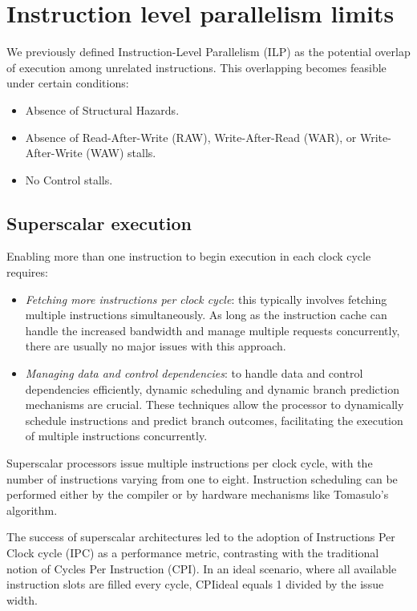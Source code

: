 \section{Instruction level parallelism limits}

We previously defined Instruction-Level Parallelism (ILP) as the potential overlap of execution among unrelated instructions. 
This overlapping becomes feasible under certain conditions:
\begin{itemize}
    \item Absence of Structural Hazards.
    \item Absence of Read-After-Write (RAW), Write-After-Read (WAR), or Write-After-Write (WAW) stalls.
    \item No Control stalls.
\end{itemize}

\subsection{Superscalar execution}
Enabling more than one instruction to begin execution in each clock cycle requires:
\begin{itemize}
    \item \textit{Fetching more instructions per clock cycle}: this typically involves fetching multiple instructions simultaneously. 
        As long as the instruction cache can handle the increased bandwidth and manage multiple requests concurrently, there are usually no major issues with this approach.
    \item \textit{Managing data and control dependencies}: to handle data and control dependencies efficiently, dynamic scheduling and dynamic branch prediction mechanisms are crucial. 
        These techniques allow the processor to dynamically schedule instructions and predict branch outcomes, facilitating the execution of multiple instructions concurrently.
\end{itemize}
Superscalar processors issue multiple instructions per clock cycle, with the number of instructions varying from one to eight.
Instruction scheduling can be performed either by the compiler or by hardware mechanisms like Tomasulo's algorithm. 

The success of superscalar architectures led to the adoption of Instructions Per Clock cycle (IPC) as a performance metric, contrasting with the traditional notion of Cycles Per Instruction (CPI). 
In an ideal scenario, where all available instruction slots are filled every cycle, CPIideal equals 1 divided by the issue width.

